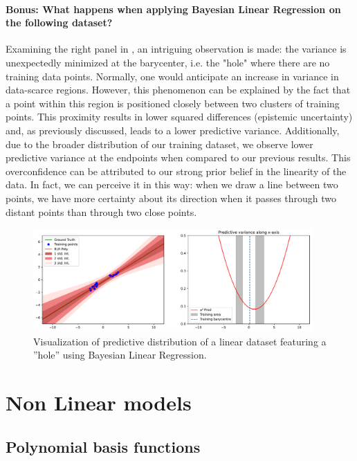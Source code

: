 \paragraph*{Bonus: What happens when applying Bayesian Linear Regression on the following dataset?}

Examining the right panel in , an intriguing observation is made: the variance is unexpectedly minimized at the barycenter, i.e. the "hole" where there are no training data points. Normally, one would anticipate an increase in variance in data-scarce regions. However, this phenomenon can be explained by the fact that a point within this region is positioned closely between two clusters of training points. This proximity results in lower squared differences (epistemic uncertainty) and, as previously discussed, leads to a lower predictive variance. Additionally, due to the broader distribution of our training dataset, we observe lower predictive variance at the endpoints when compared to our previous results. This overconfidence can be attributed to our strong prior belief in the linearity of the data. In fact, we can perceive it in this way: when we draw a line between two points, we have more certainty about its direction when it passes through two distant points than through two close points.

\begin{figure}[H]
    \centering
    \includegraphics[width=0.95\textwidth]{phi_linear_hole.pdf}
    \caption{Visualization of predictive distribution of a linear dataset featuring a ''hole'' using Bayesian Linear Regression.}
    \label{fig:phi_linear_hole}
\end{figure}

\section{Non Linear models}

\subsection{Polynomial basis functions}

